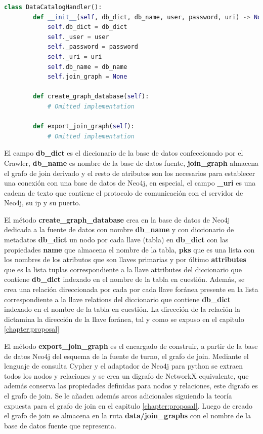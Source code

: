 \begin{lstlisting}[label={code:catalog}, caption={Clase DataCatalogHandler}, language={python}]
    class DataCatalogHandler():
        def __init__(self, db_dict, db_name, user, password, uri) -> None:
            self.db_dict = db_dict
            self._user = user
            self._password = password
            self._uri = uri
            self.db_name = db_name
            self.join_graph = None

        def create_graph_database(self):
            # Omitted implementation

        def export_join_graph(self):
            # Omitted implementation

\end{lstlisting}

El campo \textbf{db\_dict} es el diccionario de la base de datos confeccionado por el Crawler, \textbf{db\_name} es 
nombre de la base de datos fuente, \textbf{join\_graph} almacena el grafo de join derivado y el resto de atributos 
son los necesarios para establecer una conexi\'on con una base de datos de Neo4j, en especial, el campo \textbf{\_uri} 
es una cadena de texto que contiene el protocolo de comunicaci\'on con el servidor de Neo4j, su ip y su puerto. 

El m\'etodo \textbf{create\_graph\_database} crea en la base de datos de Neo4j dedicada a la fuente de datos con nombre 
\textbf{db\_name} y con diccionario de metadatos \textbf{db\_dict} un nodo por cada llave (tabla) 
en \textbf{db\_dict} con las propiedades \textbf{name} que almacena el nombre de la tabla, \textbf{pks} que es una 
lista con los nombres de los atributos que son llaves primarias y por \'ultimo \textbf{attributes} que 
es la lista tuplas correspondiente a la llave attributes del diccionario que contiene \textbf{db\_dict} 
indexado en el nombre de la tabla en cuesti\'on. Adem\'as, se crea una relación direccionada por cada por cada llave for\'anea 
presente en la lista correspondiente a la llave relations del diccionario que contiene \textbf{db\_dict} 
indexado en el nombre de la tabla en cuesti\'on. La direcci\'on de la relación la dictamina la direcci\'on de la llave 
for\'anea, tal y como se expuso en el capitulo \ref{chapter:proposal}

El m\'etodo \textbf{export\_join\_graph} es el encargado de construir, a partir de la base de datos Neo4j del esquema 
de la fuente de turno, el grafo de join. Mediante el lenguaje de consulta Cypher y el adaptador de Neo4j para python 
se extraen todos los nodos y relaciones y se crea un digrafo de NetworkX equivalente, que adem\'as conserva las 
propiedades definidas para nodos y relaciones, este digrafo es el grafo de join. Se le añaden adem\'as arcos 
adicionales siguiendo la teor\'ia expuesta para el grafo de join en el capitulo \ref{chapter:proposal}. Luego 
de creado el grafo de join se almacena en la ruta \textbf{data/join\_graphs} con el nombre de la base de datos fuente 
que representa.


